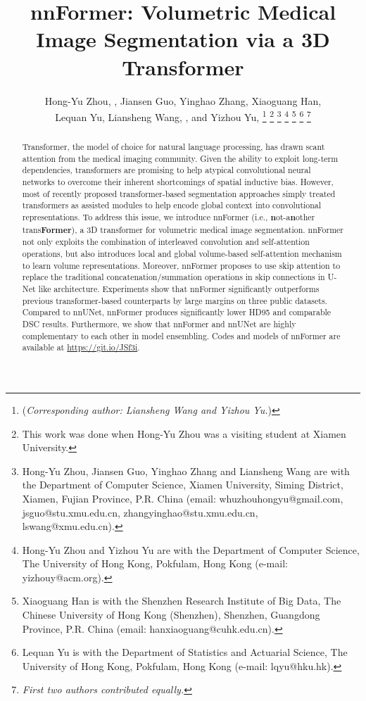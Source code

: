 \documentclass[journal,twoside,web]{ieeecolor}
\begin{document}
\title{nnFormer: Volumetric Medical Image Segmentation via a 3D Transformer}
\author{Hong-Yu Zhou, , Jiansen Guo, Yinghao Zhang, Xiaoguang Han, \\ Lequan Yu, Liansheng Wang, , and Yizhou Yu, 
\thanks{(\emph{Corresponding author: Liansheng Wang and Yizhou Yu.})}
\thanks{This work was done when Hong-Yu Zhou was a visiting student at Xiamen University.}
\thanks{Hong-Yu Zhou, Jiansen Guo, Yinghao Zhang and Liansheng Wang are with the Department of Computer Science, Xiamen University, Siming District, Xiamen, Fujian Province, P.R. China (email: whuzhouhongyu@gmail.com, jsguo@stu.xmu.edu.cn, zhangyinghao@stu.xmu.edu.cn, lswang@xmu.edu.cn).}
\thanks{Hong-Yu Zhou and Yizhou Yu are with the Department of Computer Science, The University of Hong Kong, Pokfulam, Hong Kong (e-mail: yizhouy@acm.org).}
\thanks{Xiaoguang Han is with the Shenzhen Research Institute of Big Data, The Chinese University of Hong Kong (Shenzhen), Shenzhen, Guangdong Province, P.R. China (email: hanxiaoguang@cuhk.edu.cn).}
\thanks{Lequan Yu is with the Department of Statistics and Actuarial Science, The University of Hong Kong, Pokfulam, Hong Kong (e-mail: lqyu@hku.hk).}
\thanks{\emph{First two authors contributed equally.}}
}
\maketitle
\begin{abstract}
Transformer, the model of choice for natural language processing, has drawn scant attention from the medical imaging community. Given the ability to exploit long-term dependencies, transformers are promising to help atypical convolutional neural networks to overcome their inherent shortcomings of spatial inductive bias. However, most of recently proposed transformer-based segmentation approaches simply treated transformers as assisted modules to help encode global context into convolutional representations. To address this issue, we introduce nnFormer (i.e., \textbf{n}ot-a\textbf{n}other trans\textbf{Former}), a 3D transformer for volumetric medical image segmentation. nnFormer not only exploits the combination of interleaved convolution and self-attention operations, but also introduces local and global volume-based self-attention mechanism to learn volume representations. Moreover, nnFormer proposes to use skip attention to replace the traditional concatenation/summation operations in skip connections in U-Net like architecture. Experiments show that nnFormer significantly outperforms previous transformer-based counterparts by large margins on three public datasets. Compared to nnUNet, nnFormer produces significantly lower HD95 and comparable DSC results. Furthermore, we show that nnFormer and nnUNet are highly complementary to each other in model ensembling. Codes and models of nnFormer are available at \url{https://git.io/JSf3i}. 
\end{abstract}
\end{document}
